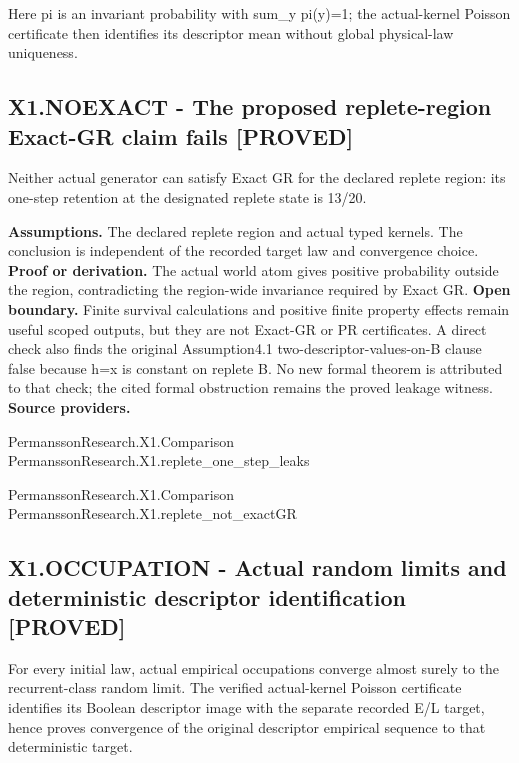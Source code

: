 \documentclass[11pt,a4paper]{article}
\newcommand{\companionEquation}[1]{\begin{center}\sbox{\companionEqBox}{$\displaystyle #1$}\ifdim\wd\companionEqBox>\linewidth\resizebox{\linewidth}{!}{\usebox{\companionEqBox}}\else\usebox{\companionEqBox}\fi\end{center}}
\begin{document}
\companionEquation{g(y)-\sum_zK(y,z)g(z)=\mathbf{1}_{\{x=1\}}-\nu,\qquad \sum_y\pi(y)K(y,z)=\pi(z)\ \Longrightarrow\ \sum_y\pi(y)\mathbf{1}_{\{x=1\}}=\nu.}
{\small Here pi is an invariant probability with sum\_y pi(y)=1; the actual-kernel Poisson certificate then identifies its descriptor mean without global physical-law uniqueness.}
\subsection*{X1.NOEXACT - The proposed replete-region Exact-GR claim fails [PROVED]}
Neither actual generator can satisfy Exact GR for the declared replete region: its one-step retention at the designated replete state is 13/20.

\textbf{Assumptions.} The declared replete region and actual typed kernels. The conclusion is independent of the recorded target law and convergence choice.
\textbf{Proof or derivation.} The actual world atom gives positive probability outside the region, contradicting the region-wide invariance required by Exact GR.
\textbf{Open boundary.} Finite survival calculations and positive finite property effects remain useful scoped outputs, but they are not Exact-GR or PR certificates. A direct check also finds the original Assumption4.1 two-descript\allowbreak{}or-values-on\allowbreak{}-B clause false because h=x is constant on replete B. No new formal theorem is attributed to that check; the cited formal obstruction remains the proved leakage witness.
\textbf{Source providers.}
{\footnotesize\raggedright PermanssonRe\allowbreak{}search.X1.Co\allowbreak{}mparison\\ PermanssonRe\allowbreak{}search.X1.re\allowbreak{}plete\_one\_st\allowbreak{}ep\_leaks\par}
{\footnotesize\raggedright PermanssonRe\allowbreak{}search.X1.Co\allowbreak{}mparison\\ PermanssonRe\allowbreak{}search.X1.re\allowbreak{}plete\_not\_ex\allowbreak{}actGR\par}
\subsection*{X1.OCCUPATION - Actual random limits and deterministic descriptor identification [PROVED]}
For every initial law, actual empirical occupations converge almost surely to the recurrent-class random limit. The verified actual-kernel Poisson certificate identifies its Boolean descriptor image with the separate recorded E/L target, hence proves convergence of the original descriptor empirical sequence to that deterministic target.
\end{document}
